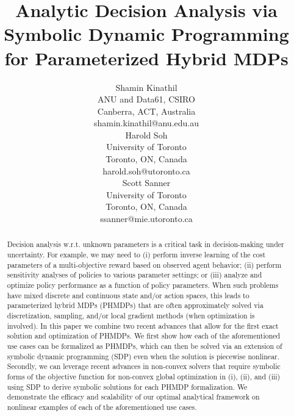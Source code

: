 \documentclass[letterpaper]{article}
\begin{document}
    
\title{Analytic Decision Analysis via Symbolic Dynamic Programming for Parameterized Hybrid MDPs}

\author{Shamin Kinathil \\
    ANU and Data61, CSIRO \\
    Canberra, ACT, Australia \\
    shamin.kinathil@anu.edu.au \\
    \And
    Harold Soh \\
    University of Toronto \\
    Toronto, ON, Canada \\
    harold.soh@utoronto.ca \\
    \And
    Scott Sanner  \\
    University of Toronto \\
    Toronto, ON, Canada \\
    ssanner@mie.utoronto.ca \\
}
\maketitle

\begin{abstract}
    
    Decision analysis w.r.t. unknown parameters is a critical task in decision-making under uncertainty.  For example, we may need to (i) perform inverse learning of the cost parameters of a multi-objective reward based on observed agent behavior; (ii) perform sensitivity analyses of policies to various parameter settings; or (iii) analyze and optimize policy performance as a function of policy parameters. When such problems have mixed discrete and continuous state and/or action spaces, this leads to parameterized hybrid MDPs (PHMDPs) that are often approximately solved via discretization, sampling, and/or local gradient methods (when optimization is involved). In this paper we combine two recent advances that allow for the first exact solution and optimization of PHMDPs. We first show how each of the aforementioned use cases can be formalized as PHMDPs, which can then be solved via an extension of symbolic dynamic programming (SDP) even when the solution is piecewise nonlinear. Secondly, we can leverage recent advances in non-convex solvers that require symbolic forms of the objective function for non-convex global optimization in (i), (ii), and (iii) using SDP to derive symbolic solutions for each PHMDP formalization. We demonstrate the efficacy and scalability of our optimal analytical framework on nonlinear examples of each of the aforementioned use cases.
    
\end{abstract}
\end{document}
